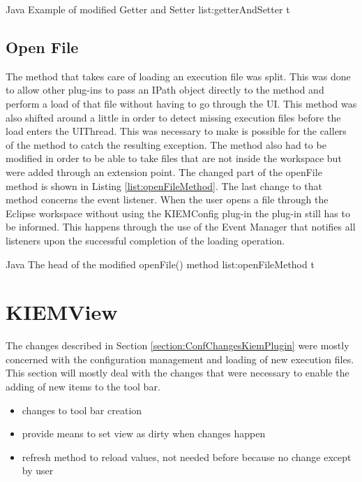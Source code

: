 \listingjava
{}
{Java}
{Example of modified Getter and Setter}
{list:getterAndSetter}
{t}


\subsection{Open File}
The method that takes care of loading an execution file was split. This was done to allow
other plug-ins to pass an IPath object directly to the method and perform a load of that file without
having to go through the \ac{UI}. This method was also shifted around a little in order to detect
missing execution files before the load enters the UIThread. This was necessary to make is possible for
the callers of the method to catch the resulting exception.
The method also had to be modified in order to be able to take files that are not inside the workspace
but were added through an extension point. The changed part of the openFile method is shown in 
Listing \ref{list:openFileMethod}.
The last change to that method concerns the event listener. When the user opens a file through the
Eclipse workspace without using the \ac{KIEMConfig} plug-in the plug-in still has to be informed.
This happens through the use of the Event Manager that notifies all listeners upon the successful
completion of the loading operation.

\listingjava
{}
{Java}
{The head of the modified openFile() method}
{list:openFileMethod}
{t}


\section{KIEMView}
\label{section:ConfChangesKiemView}
The changes described in Section \ref{section:ConfChangesKiemPlugin} were mostly concerned with the
configuration management and loading of new execution files. This section will mostly deal with the changes
that were necessary to enable the adding of new items to the tool bar.

\begin{itemize}
 \item changes to tool bar creation
 \item provide means to set view as dirty when changes happen
 \item refresh method to reload values, not needed before because no change except by user
\end{itemize}